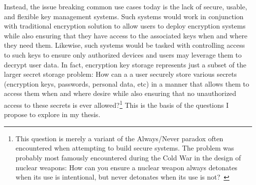 Instead, the issue breaking common use cases today is the lack of
secure, usable, and flexible key management systems. Such systems
would work in conjunction with traditional encryption solution to
allow users to deploy encryption systems while also ensuring that they
have access to the associated keys when and where they need
them. Likewise, such systems would be tasked with controlling access
to such keys to ensure only authorized devices and users may leverage
them to decrypt user data. In fact, encryption key storage represents
just a subset of the larger secret storage problem: How can a a user
securely store various secrets (encryption keys, passwords, personal
data, etc) in a manner that allows them to access them when and where
desire while also ensuring that no unauthorized access to these
secrets is ever allowed?\footnote{This question is merely a variant of
  the Always/Never paradox often encountered when attempting to build
  secure systems. The problem was probably most famously encountered
  during the Cold War in the design of nuclear weapons: How can you
  ensure a nuclear weapon always detonates when its use is
  intentional, but never detonates when its use is
  not?~\cite{schlosser2013}} This is the basis of the questions I
propose to explore in my thesis.

